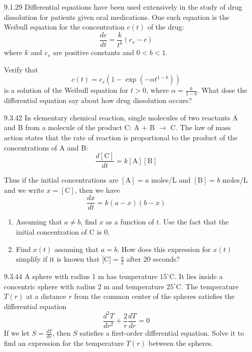 \documentclass{article}
\begin{document}
\begin{enumerate}
\vspace{5cm}

\item[9.1.29]
    Differential equations have been used extensively in the study of drug dissolution
    for patients given oral medications. One such equation is the Weibull equation
    for the concentration $c(t)$ of the drug:
    \[
        \frac{dc}{dt} = \frac{k}{t^{b}}(c_{s}-c)
    \]
    where $k$ and $c_{s}$ are positive constants and $0 < b < 1$.

    Verify that
    \[
        c(t) = c_{s}(1-\exp(-\alpha t^{1-b}))
    \]
    is a solution of the Weibull equation for $t > 0$, where $\alpha = \frac{k}{1-b}$.
    What dose the differential equation say about how drug dissolution occurs?

\newpage

\item[9.3.42]
    In elementary chemical reaction, single molecules of two reactants A and B from
    a molecule of the product C: A + B $ \longrightarrow $ C. The law of mass action
    states that the rate of reaction is proportional to the product of the concentrations
    of A and B:
    \[
        \frac{d[\text{C}]}{dt} = k [\text{A}][\text{B}]
    \]

    Thus if the initial concentrations are $[\text{A}] = a$ moles/L
    and $[\text{B}] = b$ moles/L and we write $x = [\text{C}]$, then we have
    \[
        \frac{dx}{dt} = k(a-x)(b-x)
    \]
    \begin{enumerate}
        \item Assuming that $a \neq b$, find $x$ as a function of $t$.
            Use the fact that the initial concentration of C is 0.
        \item Find $x(t)$ assuming that $a=b$. How does this expression for $x(t)$
            simplify if it is known that [C]$=\frac{a}{2}$ after 20 seconds?
    \end{enumerate}

\vspace{6cm}

\item[9.3.44]
    A sphere with radius 1 m has temperature $15^{\circ}$C. It lies inside a concentric
    sphere with radius 2 m and temperature $25^{\circ}$C. The temperature $T(r)$ at
    a distance $r$ from the common center of the spheres satisfies the differential
    equation
    \[
        \frac{d^{2}T}{dr^{2}} + \frac{2}{r}\frac{dT}{dr} = 0
    \]
    If we let $S = \frac{dT}{dr}$, then $S$ satisfies a first-order differential
    equation. Solve it to find an expression for the temperature $T(r)$ between the
    spheres.


\end{enumerate}
\end{document}
